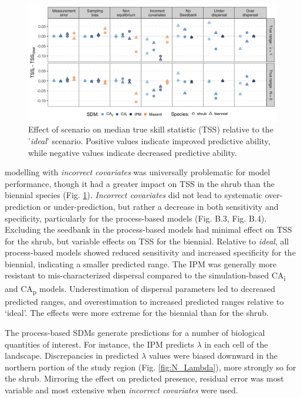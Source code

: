 \documentclass[preprint,review,times,12pt]{elsarticle}
\begin{document}
\begin{figure}
	\centering\includegraphics[width=\linewidth]{figs/fig_TSSvIdeal.jpg}
	\caption{\label{fig:TSSvIdeal} Effect of scenario on median true skill statistic (TSS) relative to the '\emph{ideal}' scenario. Positive values indicate improved predictive ability, while negative values indicate decreased predictive ability.}
\end{figure}


modelling with \emph{incorrect covariates} was universally problematic for model performance, though it had a greater impact on TSS in the shrub than the biennial species (Fig. \ref{fig:TSSvIdeal}). \emph{Incorrect covariates} did not lead to systematic over-prediction or under-prediction, but rather a decrease in both sensitivity and specificity, particularly for the process-based models (Fig. B.3, Fig. B.4). Excluding the seedbank in the process-based models had minimal effect on TSS for the shrub, but variable effects on TSS for the biennial. Relative to \emph{ideal}, all process-based models showed reduced sensitivity and increased specificity for the biennial, indicating a smaller predicted range. The IPM was generally more resistant to mis-characterized dispersal compared to the simulation-based CA\textsubscript{i} and CA\textsubscript{p} models. Underestimation of dispersal parameters led to decreased predicted ranges, and overestimation to increased predicted ranges relative to ‘ideal’. The effects were more extreme for the biennial than for the shrub.

The process-based SDMs generate predictions for a number of biological quantities of interest. For instance, the IPM predicts $\lambda$ in each cell of the landscape. Discrepancies in predicted $\lambda$ values were biased downward in the northern portion of the study region (Fig. \ref{fig:N_Lambda}), more strongly so for the shrub. Mirroring the effect on predicted presence, residual error was most variable and most extensive when \emph{incorrect covariates} were used. 
\end{document}
